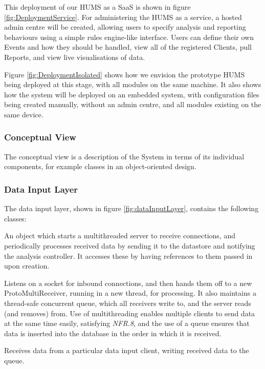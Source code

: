 \documentclass[10pt,a4paper]{article}
\newcommand{\nfrit}[1]{\textit{NFR.#1}}
\begin{document}
This deployment of our HUMS as a SaaS is shown in figure \ref{fig:DeploymentService}. For administering the HUMS as a service, a hosted admin centre will be created, allowing users to specify analysis and reporting behaviours using a simple rules engine-like interface. Users can define their own Events and how they should be handled, view all of the registered Clients, pull Reports, and view live visualisations of data.

Figure \ref{fig:DeploymentIsolated} shows how we envision the prototype HUMS being deployed at this stage, with all modules on the same machine. It also shows how the system will be deployed on an embedded system, with configuration files being created manually, without an admin centre, and all modules existing on the same device.

\subsubsection{Conceptual View}
The conceptual view is a description of the System in terms of its individual components, for example classes in an object-oriented design.

\subsubsection*{Data Input Layer}

The data input layer, shown in figure \ref{fig:dataInputLayer},
contains the following classes:

\begin{description}[leftmargin=1cm,labelindent=1cm]
  \item[DataInputServer] An object which starts a multithreaded
    server to receive connections, and periodically processes
    received data by sending it to the datastore and notifying the
    analysis controller. It accesses these by having references to them
    passed in upon creation.
  \vspace{0.2cm}
  \item[ProtoReceiver] Listens on a socket for inbound connections,
    and then hands them off to a new ProtoMultiReceiver, running in a
    new thread, for processing. It also maintains a thread-safe
    concurrent queue, which all receivers write to, and the
    server reads (and removes) from. Use of multithreading
    enables multiple clients to send data at the same time easily, satisfying \nfrit{8}, and
    the use of a queue ensures that data is inserted into the database
    in the order in which it is received.
  \vspace{0.2cm}
  \item[ProtoMultiReceiver] Receives data from a particular data input
    client, writing received data to the queue.
\end{description}
\end{document}
